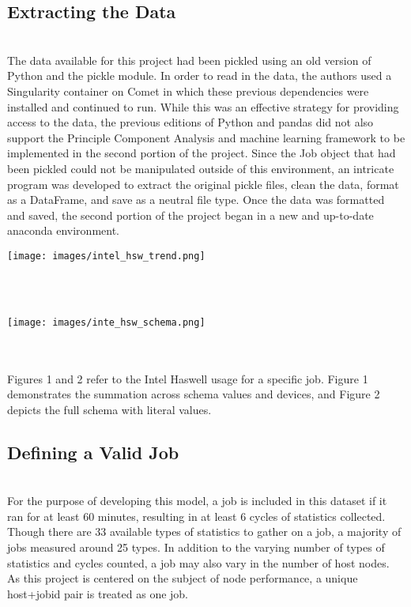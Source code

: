 \documentclass[10pt]{article}
\newenvironment{boxit}{
   \begin{lrbox}{\dummybox}
      \begin{minipage}{0.925\columnwidth}
      }{
      \end{minipage}
   \end{lrbox}
   \raisebox{-\depth}
      {\psshadowbox[framesep=1em,framearc=0.1,shadow=true]
         {\usebox{\dummybox}}}
   \vspace{0.005\textheight}
}
\begin{document}
\begin{center}
\begin{multicols}{3}
\begin{boxit}
	        \subsection*{\red Extracting the Data}
	        \vspace{-0.5em}
                \\The data available for this project had been pickled using an old version of Python and the pickle module. In order to read in the data, the authors used a Singularity container on Comet in which these previous dependencies were installed and continued to run. While this was an effective strategy for providing access to the data, the previous editions of Python and pandas did not also support the Principle Component Analysis and machine learning framework to be implemented in the second portion of the project. Since the Job object that had been pickled could not be manipulated outside of this environment, an intricate program was developed to extract the original pickle files, clean the data, format as a DataFrame, and save as a neutral file type. Once the data was formatted and saved, the second portion of the project began in a new and up-to-date anaconda environment.\\
	        \parbox[c]{6.5cm}{\texttt{[image: images/intel\_hsw\_trend.png]}}\\
	        \label{Figure 1}\\
	        \parbox[c]{8.5cm}{\texttt{[image: images/inte\_hsw\_schema.png]}}\\
	        \label{Figure 2}
	        \\Figures 1 and 2 refer to the Intel Haswell usage for a specific job. Figure 1 demonstrates the summation across schema values and devices, and Figure 2 depicts the full schema with literal values.
	        
	        \subsection*{\red Defining a Valid Job}
	        \vspace{-0.5em}
                \\For the purpose of developing this model, a job is included in this dataset if it ran for at least 60 minutes, resulting in at least 6 cycles of statistics collected. Though there are 33 available types of statistics to gather on a job, a majority of jobs measured around 25 types. In addition to the varying number of types of statistics and cycles counted, a job may also vary in the number of host nodes. As this project is centered on the subject of node performance, a unique host+jobid pair is treated as one job.\\
	 \end{boxit}
	 


\end{multicols}
\end{center}
\end{document}
